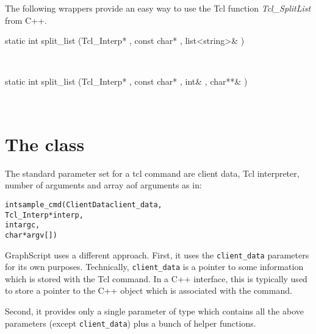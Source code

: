 \documentclass[twoside,fleqn]{report}
\begin{document}
The following wrappers provide an easy way to use the Tcl
function \emph{Tcl\_SplitList} from C++.

\begin{Cdefinition}
  
  \item[static int split\_list (Tcl\_Interp* \Param{interp},
  const char* \Param{name}, list<string>\& \Param{splitted})]
  \strut\\
  
  \item[static int split\_list (Tcl\_Interp* \Param{interp}, const
  char* \Param{name}, int\& \Param{argc}, char**\& \Param{argv})]
  \strut\\
    
\end{Cdefinition}


%
%
%


\section{The class }
\label{s:Tcl_info}


The standard parameter set for a tcl command are client data, Tcl
interpreter, number of arguments and array aof arguments as in:

\begin{alltt}
int sample_cmd (ClientData client_data,
    Tcl_Interp* interp,
    int argc,
    char* argv[])
\end{alltt}

GraphScript uses a different approach. First, it uses the
\verb|client_data| parameters for its own purposes. Technically,
\verb|client_data| is a pointer to some information which is
stored with the Tcl command. In a C++ interface, this is
typically used to store a pointer to the C++ object which is
associated with the command.

Second, it provides only a single parameter of type
 which contains all the above parameters (except
\texttt{client\_data}) plus a bunch of helper functions.
\end{document}
